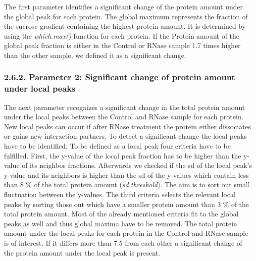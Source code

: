 \documentclass[
  12pt,
]{article}
\begin{document}
The first parameter identifies a significant change of the protein
amount under the global peak for each protein. The global maximum
represents the fraction of the sucrose gradient containing the highest
protein amount. It is determined by using the \emph{which.max()}
function for each protein. If the Protein amount of the global peak
fraction is either in the Control or RNase sample 1.7 times higher than
the other sample, we defined it as a significant change.

\hypertarget{parameter-2-significant-change-of-protein-amount-under-local-peaks}{%
\subsubsection{2.6.2. Parameter 2: Significant change of protein amount
under local
peaks}\label{parameter-2-significant-change-of-protein-amount-under-local-peaks}}

\renewcommand{\section}{\titlespacing*{\section}{0pt}{0.3\baselineskip}{0.2\baselineskip}\section}

The next parameter recognizes a significant change in the total protein
amount under the local peaks between the Control and RNase sample for
each protein. New local peaks can occur if after RNase treatment the
protein either dissociates or gains new interaction partners. To detect
a significant change the local peaks have to be identified. To be
defined as a local peak four criteria have to be fulfilled. First, the
y-value of the local peak fraction has to be higher than the y-value of
its neighbor fractions. Afterwards we checked if the sd of the local
peak's y-value and its neighbors is higher than the sd of the y-values
which contain less than 8 \% of the total protein amount
(\emph{sd.threshold}). The aim is to sort out small fluctuation between
the y-values. The third criteria selects the relevant local peaks by
sorting those out which have a smaller protein amount than 3 \% of the
total protein amount. Most of the already mentioned criteria fit to the
global peaks as well and thus global maxima have to be removed. The
total protein amount under the local peaks for each protein in the
Control and RNase sample is of interest. If it differs more than 7.5
from each other a significant change of the protein amount under the
local peak is present.
\end{document}

